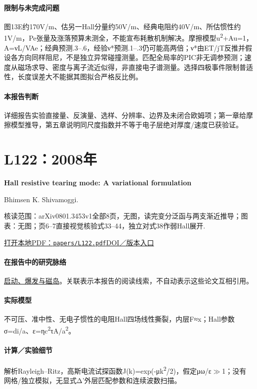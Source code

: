 \paragraph{限制与未完成问题}图13E约170V/m、估另一Hall分量约50V/m、经典电阻约40V/m、所估惯性约1V/m，Pe张量及涨落预算未测全，不能宣布耗散机制解决。摩擦模型u\textsuperscript{2}+Au=1，A=νL/VAe；经典预测.3–.6，经验ν*预测.1–.3仍可能高两倍；ν*由ET/jT反推并假设各方向同样阻尼，不是独立异常碰撞测量。匹配全局率的PIC非无调参预测；速度从磁场求导、密度与离子流近似得，非直接电子谱测量。选择四极事件限制普适性，长度误差大不能据其图拟合严格反比例。

\paragraph{本报告判断}详细报告实验直接量、反演量、选样、分辨率、边界及未闭合欧姆项；第一章给摩擦模型推导，第五章说明同尺度指数并不等于电子层绝对厚度/速度已获验证。

\section{L122：2008年}\label{paper:L122}

\textbf{Hall resistive tearing mode: A variational formulation}\citep{L122}\

Bhimsen K. Shivamoggi.

\textsf{核读范围：}arXiv0801.3453v1全部8页，无图，读完变分泛函与两支渐近推导；\textsf{图表：}无图；页6–7直接视觉核验式33–44，独立对式38作弱Hall展开.

\href{run:papers/L122.pdf}{打开本地PDF：\texttt{papers/L122.pdf}}\quad\href{https://doi.org/10.1209/0295-5075/83/55002}{DOI／版本入口}

\paragraph{在报告中的研究脉络}\hyperref[story:onset]{启动、爆发与磁岛}。关联表示本报告的阅读线索，不自动表示这些论文互相引用。

\paragraph{实际模型}不可压、准中性、无电子惯性的电阻Hall四场线性撕裂，内层F≈x；Hall参数σ=di/a、ε=ηc\textsuperscript{2}τA/a\textsuperscript{2}。

\paragraph{计算／实验细节}解析Rayleigh–Ritz，高斯电流试探函数J(k)=exp(-μk\textsuperscript{2}/2)，假定μω/ε\ensuremath{\gg}1；没有网格/独立模拟，无显式Δ'外层匹配参数和连续波数扫描。

